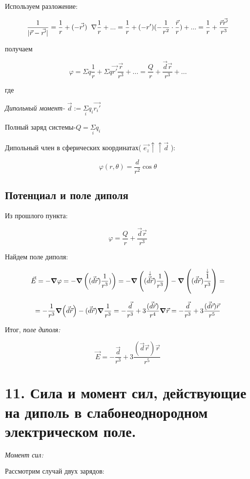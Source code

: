 \documentclass[a4paper,12pt]{article}
\newcommand{\kr}[1]{\textit{#1}}
\newcommand{\fc}[1]{\[#1\]}
\newcommand{\gradd}{\hspace{0.2cm}\scriptsize \nabla}
\begin{document}
\newpage

Используем разложение:

\fc{\frac{1}{|\vec{r}-\vec{r'}|}=\frac{1}{r}+(-\vec{r'})\gradd\frac{1}{r}+...=\frac{1}{r}+(-r')(-\frac{1}{r^2}\cdot\frac{\vec{r}}{r})+...=\frac{1}{r}+\frac{\vec{r}\vec{r'}}{r^3}}

получаем

\fc{\varphi=\Sigma q\frac{1}{r}+\Sigma q\vec{r'}\frac{\vec{r}}{r^3}+...=\frac{Q}{r}+\frac{\vec{d}\vec{r}}{r^3}+...}

где

\kr{Дипольный момент-} $\vec{d}:=\underset{i}{\Sigma}q_i\vec{r_i'}$

Полный заряд системы-$Q=\underset{i}{\Sigma}q_i$

Дипольный член в сферических координатах( $\vec{e_z}\uparrow\uparrow\vec{d}$ ):

\fc{\varphi(r,\theta)=\frac{d}{r^2}\cos \theta}

\subsection*{Потенциал и поле диполя}

Из прошлого пункта:

\fc{\varphi=\frac{Q}{r}+\frac{\vec{d}\vec{r}}{r^3}}

Найдем поле диполя:

\fc{\vec{E}=-\grad \varphi=-\grad \left((\vec{d}\vec{r})\frac{1}{r^3})\right)=-\grad \left(\overset{\downarrow}{(\vec{d}\vec{r})}\frac{1}{r^3}\right)-\grad \left((\vec{d}\vec{r})\overset{\downarrow}{\frac{1}{r^3}}\right)=}

\fc{=-\frac{1}{r^3}\grad (\vec{d}\vec{r})-(\vec{d}\vec{r})\grad\frac{1}{r^3}=-\frac{\vec{d}}{r^3}+3\frac{(\vec{d}\vec{r})}{r^4}\grad \vec{r}=-\frac{\vec{d}}{r^3}+3\frac{(\vec{d}\vec{r})\vec{r}}{r^5}}

Итог, \kr{поле диполя:}

\fc{\vec{E}=-\frac{\vec{d}}{r^3}+3\frac{(\vec{d}\vec{r})\vec{r}}{r^5}}

\newpage

\section*{11. Сила и момент сил, действующие на диполь в слабонеоднородном
электрическом поле.}

\kr{Момент сил:}

Рассмотрим случай двух зарядов:
\end{document}
